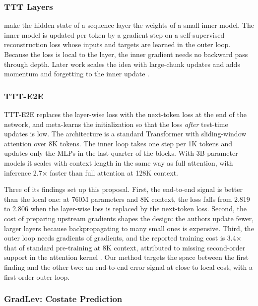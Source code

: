 \documentclass{article}
\begin{document}
\subsubsection{TTT Layers}

\textcite{sun2024tttlayers} make the hidden state of a sequence layer the
weights of a small inner model. The inner model is updated per token by a
gradient step on a self-supervised reconstruction loss whose inputs and targets
are learned in the outer loop. Because the loss is local to the layer, the
inner gradient needs no backward pass through depth. Later work scales the idea
with large-chunk updates \parencite{zhang2025lact} and adds momentum and
forgetting to the inner update \parencite{behrouz2025titans}.

\subsubsection{TTT-E2E}

TTT-E2E \parencite{tandon2025ttte2e} replaces the layer-wise loss with the
next-token loss at the end of the network, and meta-learns the initialization
so that the loss \emph{after} test-time updates is low. The architecture is a
standard Transformer with sliding-window attention over 8K tokens. The inner
loop takes one step per 1K tokens and updates only the MLPs in the last quarter
of the blocks. With 3B-parameter models it scales with context length in the
same way as full attention, with inference 2.7$\times$ faster than full
attention at 128K context.

Three of its findings set up this proposal. First, the end-to-end signal is
better than the local one: at 760M parameters and 8K context, the loss falls
from 2.819 to 2.806 when the layer-wise loss is replaced by the next-token
loss. Second,
the cost of preparing upstream gradients shapes the design: the authors update
fewer, larger layers because backpropagating to many small ones is expensive.
Third, the outer loop needs gradients of gradients, and the reported training
cost is 3.4$\times$ that of standard pre-training at 8K context, attributed to
missing second-order support in the attention kernel
\parencite{nvidia2026ttt}. Our method targets the space between the first
finding and the other two: an end-to-end error signal at close to local cost,
with a first-order outer loop.

\subsubsection{GradLev: Costate Prediction}
\label{sec:gradlev}
\end{document}
